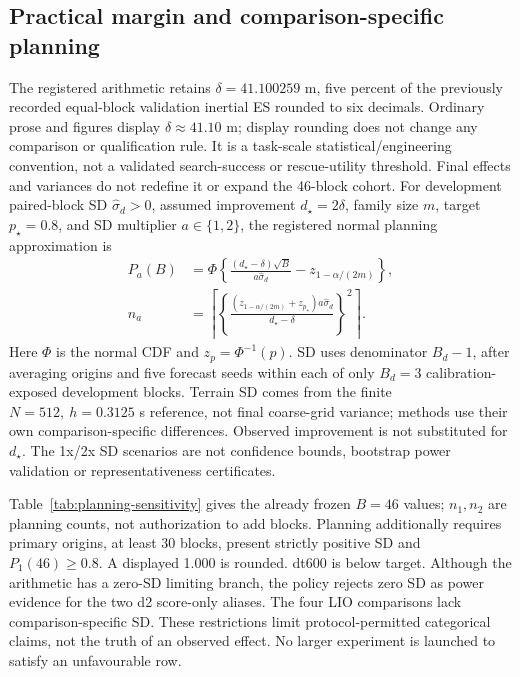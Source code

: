 \documentclass[11pt]{article}
\begin{document}
\subsection{Practical margin and comparison-specific planning}
\label{sec:planning-qualification}
The registered arithmetic retains \(\delta=41.100259\) m, five percent of
the previously recorded equal-block validation inertial ES rounded to six
decimals. Ordinary prose and figures display \(\delta\approx41.10\) m;
display rounding does not change any comparison or qualification rule.
It is a task-scale
statistical/engineering convention, not a validated search-success or rescue-utility
threshold. Final effects and variances do not redefine it or expand the 46-block cohort.
For development paired-block SD \(\widehat\sigma_d>0\), assumed improvement
\(d_\star=2\delta\), family size \(m\), target \(p_\star=0.8\), and SD
multiplier \(a\in\{1,2\}\), the registered normal planning approximation is
\begin{equation}
\begin{aligned}
 P_a(B)&=\Phi\left\{\frac{(d_\star-\delta)\sqrt B}{a\widehat\sigma_d}
                         -z_{1-\alpha/(2m)}\right\},\\
 n_a&=\left\lceil\left\{\frac{(z_{1-\alpha/(2m)}+z_{p_\star})a\widehat\sigma_d}
                              {d_\star-\delta}\right\}^{2}\right\rceil .
\end{aligned}
\label{eq:planning-power}
\end{equation}
Here \(\Phi\) is the normal CDF and \(z_p=\Phi^{-1}(p)\). SD uses denominator
\(B_d-1\), after averaging origins and five forecast seeds within each of only
\(B_d=3\) calibration-exposed development blocks. Terrain SD comes from the
finite \(N=512,\ h=0.3125\) s reference, not final coarse-grid variance;
methods use their own comparison-specific differences. Observed improvement
is not substituted for \(d_\star\). The 1x/2x SD scenarios are not confidence
bounds, bootstrap power validation or representativeness certificates.

Table~\ref{tab:planning-sensitivity} gives the already frozen \(B=46\)
values; \(n_1,n_2\) are planning counts, not authorization to add blocks.
Planning additionally requires primary origins, at least 30 blocks, present
strictly positive SD and \(P_1(46)\geq0.8\). A displayed 1.000 is rounded.
dt600 is below target. Although the arithmetic has a zero-SD limiting branch,
the policy rejects zero SD as power evidence for the two d2 score-only aliases.
The four LIO comparisons lack comparison-specific SD. These restrictions
limit protocol-permitted categorical claims, not the truth of an observed
effect. No larger experiment is launched to satisfy an unfavourable row.
\end{document}

